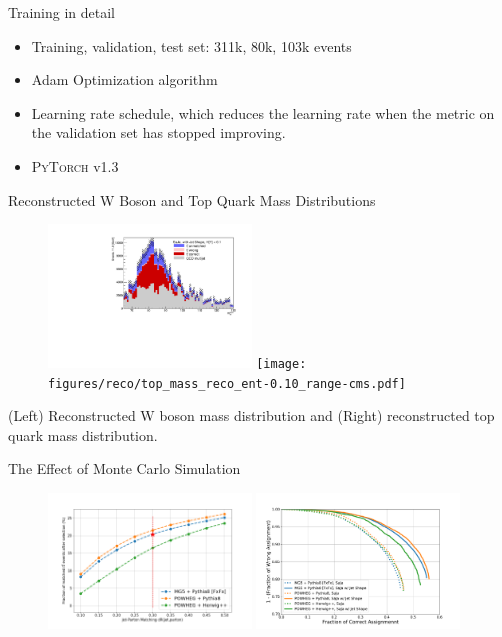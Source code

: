 \documentclass[10pt]{beamer}
\begin{document}
\begin{frame}[fragile]{Training in detail}
    \begin{itemize}
        \item Training, validation, test set: 311k, 80k, 103k events
        \item Adam Optimization algorithm
        \item Learning rate schedule, which reduces the learning rate when the metric on the validation set has stopped improving.
        \item \textsc{PyTorch} v1.3
    \end{itemize}
\end{frame}

\begin{frame}[fragile]{Reconstructed W Boson and Top Quark Mass Distributions}
    \begin{figure}
        \centering
        \includegraphics[width=0.48\textwidth]{figures/reco/w_mass_reco_ent-0.10_range-cms.pdf}
        \texttt{[image: figures/reco/top\_mass\_reco\_ent-0.10\_range-cms.pdf]}
    \end{figure}
    (Left) Reconstructed W boson mass distribution and (Right) reconstructed top quark mass distribution.
\end{frame}

\begin{frame}[fragile]{The Effect of Monte Carlo Simulation}
    \begin{figure}
        \centering
        \includegraphics[width=0.48\textwidth]{figures/generator/TotalMinDist-jet-parton-match-by-dR.png}
        \includegraphics[width=0.48\textwidth]{figures/generator/roc_tt_generator.pdf}
    \end{figure}
\end{frame}


\end{document}
